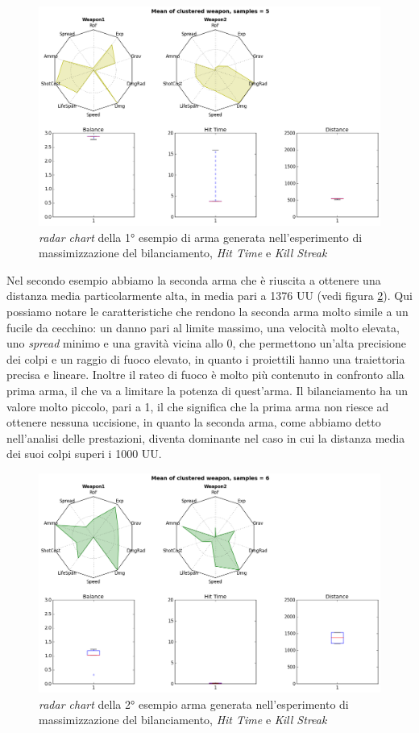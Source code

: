 \documentclass[12pt, italian]{toptesi}
\begin{document}
\begin{figure}[tp]
\centering
\includegraphics[width=1.0\textwidth]{rad_delta_dist_1}
\caption{\emph{radar chart} della 1° esempio di arma generata nell'esperimento di massimizzazione del bilanciamento, \emph{Hit Time} e \emph{Kill Streak}}
\label{fig:rad_delta_dist_1}
\end{figure}

Nel secondo esempio abbiamo la seconda arma che è riuscita a ottenere una distanza media particolarmente alta, in media pari a 1376 UU (vedi figura \ref{fig:rad_delta_dist_2}). Qui possiamo notare le caratteristiche che rendono la seconda arma molto simile a un fucile da cecchino: un danno pari al limite massimo, una velocità molto elevata, uno \emph{spread} minimo e una gravità vicina allo 0, che permettono un'alta precisione dei colpi e un raggio di fuoco elevato, in quanto i proiettili hanno una traiettoria precisa e lineare. Inoltre il rateo di fuoco è molto più contenuto in confronto alla prima arma, il che va a limitare la potenza di quest'arma.
Il bilanciamento ha un valore molto piccolo, pari a 1, il che significa che la prima arma non riesce ad ottenere nessuna uccisione, in quanto la seconda arma,  come abbiamo detto nell'analisi delle prestazioni, diventa dominante nel caso in cui la distanza media dei suoi colpi superi i 1000 UU.
\begin{figure}[tp]
\centering
\includegraphics[width=1.0\textwidth]{rad_delta_dist_2}
\caption{\emph{radar chart} della 2° esempio arma generata nell'esperimento di massimizzazione del bilanciamento, \emph{Hit Time} e \emph{Kill Streak}}
\label{fig:rad_delta_dist_2}
\end{figure}
\end{document}
